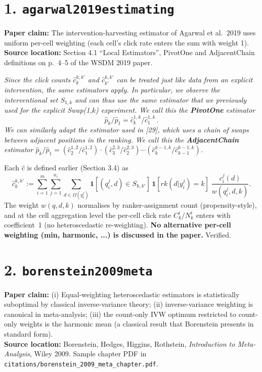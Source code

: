 \documentclass[11pt]{article}
\newcommand{\paperclaim}[1]{\textbf{Paper claim:} #1}
\newcommand{\source}[1]{\textbf{Source location:} #1}
\newcommand{\quoted}[1]{\begin{tcolorbox}\textit{#1}\end{tcolorbox}}
\begin{document}
\bigskip

\section*{1. \texttt{agarwal2019estimating}}
\paperclaim{The intervention-harvesting estimator of Agarwal et al.\ 2019
uses uniform per-cell weighting (each cell's click rate enters the sum with
weight 1).}\\
\source{Section 4.1 ``Local Estimators'', PivotOne and AdjacentChain
definitions on p.~4--5 of the WSDM 2019 paper.}

\quoted{Since the click counts $\hat c_k^{k,k'}$ and $\hat c_{k'}^{k,k'}$
can be treated just like data from an explicit intervention, the same
estimators apply. In particular, we observe the interventional set
$S_{1,k}$ and can thus use the same estimator that we previously used
for the explicit Swap(1,$k$) experiment. We call this the \textbf{PivotOne}
estimator
\[\hat p_k/\hat p_1 = \hat c_k^{1,k} / \hat c_1^{1,k}\,.\]
We can similarly adapt the estimator used in [29], which uses a chain of
swaps between adjacent positions in the ranking. We call this the
\textbf{AdjacentChain} estimator
$\hat p_k/\hat p_1 = (\hat c_2^{1,2}/\hat c_1^{1,2}) \cdot
(\hat c_3^{2,3}/\hat c_2^{2,3}) \cdots
(\hat c_k^{k-1,k}/\hat c_{k-1}^{k-1,k})$.}

\noindent Each $\hat c$ is defined earlier (Section 3.4) as
\[\hat c_k^{k,k'} := \sum_{i=1}^m \sum_{j=1}^{n_i} \sum_{d\in\Omega(q_i^j)}
\mathbf 1[(q_i^j,d)\in S_{k,k'}]\,\mathbf 1[rk(d|y_i^j)=k]\;
\frac{c_i^j(d)}{w(q_i^j,d,k)}.\]
The weight $w(q,d,k)$ normalises by ranker-assignment count
(propensity-style), and at the cell aggregation level the per-cell click
rate $C_k^i/N_k^i$ enters with coefficient~1 (no heteroscedastic re-weighting).
\textbf{No alternative per-cell weighting (min, harmonic, ...) is discussed
in the paper.} Verified.

\bigskip

\section*{2. \texttt{borenstein2009meta}}
\paperclaim{(i) Equal-weighting heteroscedastic estimators is statistically
suboptimal by classical inverse-variance theory; (ii) inverse-variance
weighting is canonical in meta-analysis; (iii) the count-only IVW optimum
restricted to count-only weights is the harmonic mean (a classical result
that Borenstein presents in standard form).}\\
\source{Borenstein, Hedges, Higgins, Rothstein, \emph{Introduction to
Meta-Analysis}, Wiley 2009. Sample chapter PDF in
\texttt{citations/borenstein\_2009\_meta\_chapter.pdf}.}
\end{document}
